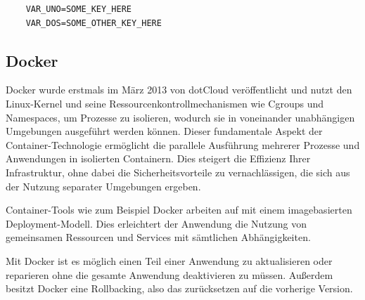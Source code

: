\begin{verbatim}
    VAR_UNO=SOME_KEY_HERE
    VAR_DOS=SOME_OTHER_KEY_HERE
\end{verbatim}

\cite{Umgebungsvariablen}



\subsection{Docker}

Docker wurde erstmals im März 2013 von dotCloud veröffentlicht und nutzt den Linux-Kernel und seine Ressourcenkontrollmechanismen wie Cgroups und Namespaces, um Prozesse zu isolieren, wodurch sie in voneinander unabhängigen Umgebungen ausgeführt werden können. Dieser fundamentale Aspekt der Container-Technologie ermöglicht die parallele Ausführung mehrerer Prozesse und Anwendungen in isolierten Containern. Dies steigert die Effizienz Ihrer Infrastruktur, ohne dabei die Sicherheitsvorteile zu vernachlässigen, die sich aus der Nutzung separater Umgebungen ergeben.

Container-Tools wie zum Beispiel Docker arbeiten auf mit einem imagebasierten Deployment-Modell. Dies erleichtert der Anwendung die Nutzung von gemeinsamen Ressourcen und Services mit sämtlichen Abhängigkeiten.

Mit Docker ist es möglich einen Teil einer Anwendung zu aktualisieren oder reparieren ohne die gesamte Anwendung deaktivieren zu müssen. Außerdem besitzt Docker eine Rollbacking, also das zurücksetzen auf die vorherige Version.

\cite{Vorteile_Nachteile_Docker}
\cite{Was_ist_Docker}





